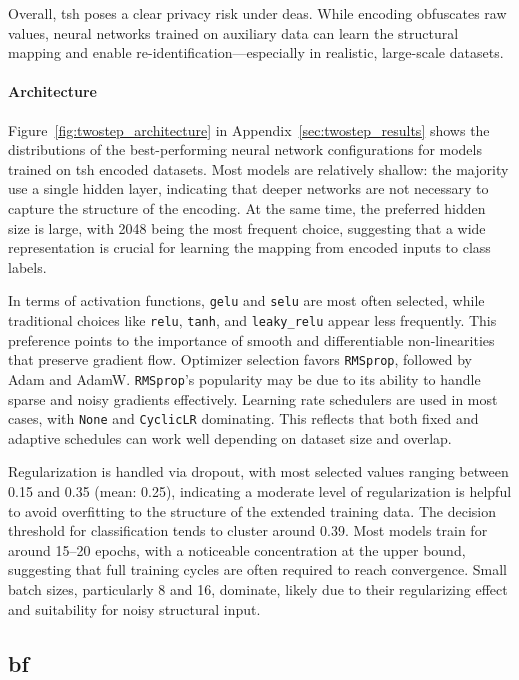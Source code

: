 Overall, \ac{tsh} poses a clear privacy risk under \ac{dea}s.
While encoding obfuscates raw values, neural networks trained on auxiliary data can learn the structural mapping and enable re-identification—especially in realistic, large-scale datasets.


\paragraph{Architecture}

Figure~\ref{fig:twostep_architecture} in Appendix~\ref{sec:twostep_results} shows the distributions of the best-performing neural network configurations for models trained on \ac{tsh} encoded datasets.
Most models are relatively shallow: the majority use a single hidden layer, indicating that deeper networks are not necessary to capture the structure of the encoding.
At the same time, the preferred hidden size is large, with 2048 being the most frequent choice, suggesting that a wide representation is crucial for learning the mapping from encoded inputs to class labels.

In terms of activation functions, \texttt{gelu} and \texttt{selu} are most often selected, while traditional choices like \texttt{relu}, \texttt{tanh}, and \texttt{leaky\_relu} appear less frequently.
This preference points to the importance of smooth and differentiable non-linearities that preserve gradient flow.
Optimizer selection favors \texttt{RMSprop}, followed by Adam and AdamW.
\texttt{RMSprop}'s popularity may be due to its ability to handle sparse and noisy gradients effectively.
Learning rate schedulers are used in most cases, with \texttt{None} and \texttt{CyclicLR} dominating.
This reflects that both fixed and adaptive schedules can work well depending on dataset size and overlap.

Regularization is handled via dropout, with most selected values ranging between 0.15 and 0.35 (mean: 0.25), indicating a moderate level of regularization is helpful to avoid overfitting to the structure of the extended training data.
The decision threshold for classification tends to cluster around 0.39.
Most models train for around 15–20 epochs, with a noticeable concentration at the upper bound, suggesting that full training cycles are often required to reach convergence.
Small batch sizes, particularly 8 and 16, dominate, likely due to their regularizing effect and suitability for noisy structural input.

\subsection{\ac{bf}}

